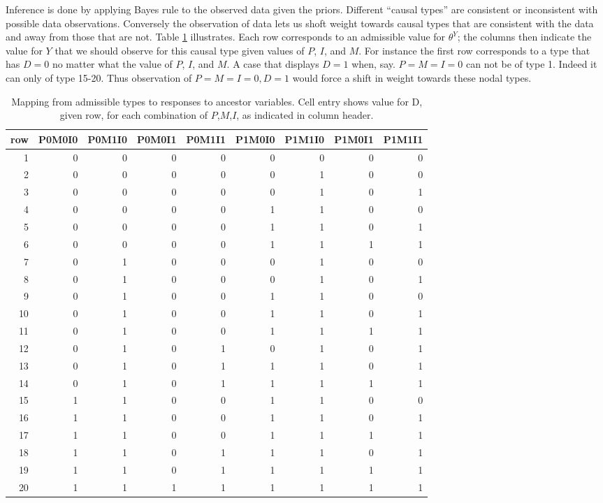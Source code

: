 \documentclass[12pt,]{book}
\begin{document}
Inference is done by applying Bayes rule to the observed data given the priors. Different ``causal types'' are consistent or inconsistent with possible data observations. Conversely the observation of data lets us shoft weight towards causal types that are consistent with the data and away from those that are not. Table \ref{tab:typemat} illustrates. Each row corresponds to an admissible value for \(\theta^Y\); the columns then indicate the value for \(Y\) that we should observe for this causal type given values of \(P\), \(I\), and \(M\). For instance the first row corresponds to a type that has \(D=0\) no matter what the value of \(P\), \(I\), and \(M\). A case that displays \(D=1\) when, say. \(P=M=I=0\) can not be of type 1. Indeed it can only of type 15-20. Thus observation of \(P=M=I=0, D=1\) would force a shift in weight towards these nodal types.

\begin{table}[t]

\caption{\label{tab:typemat}Mapping from admissible types to responses to ancestor variables. Cell entry shows value for D, given row, for each combination of $P$,$M$,$I$, as indicated in column header.}
\centering
\begin{tabular}{r|r|r|r|r|r|r|r|r}
\hline
row & P0M0I0 & P0M1I0 & P0M0I1 & P0M1I1 & P1M0I0 & P1M1I0 & P1M0I1 & P1M1I1\\
\hline
1 & 0 & 0 & 0 & 0 & 0 & 0 & 0 & 0\\
\hline
2 & 0 & 0 & 0 & 0 & 0 & 1 & 0 & 0\\
\hline
3 & 0 & 0 & 0 & 0 & 0 & 1 & 0 & 1\\
\hline
4 & 0 & 0 & 0 & 0 & 1 & 1 & 0 & 0\\
\hline
5 & 0 & 0 & 0 & 0 & 1 & 1 & 0 & 1\\
\hline
6 & 0 & 0 & 0 & 0 & 1 & 1 & 1 & 1\\
\hline
7 & 0 & 1 & 0 & 0 & 0 & 1 & 0 & 0\\
\hline
8 & 0 & 1 & 0 & 0 & 0 & 1 & 0 & 1\\
\hline
9 & 0 & 1 & 0 & 0 & 1 & 1 & 0 & 0\\
\hline
10 & 0 & 1 & 0 & 0 & 1 & 1 & 0 & 1\\
\hline
11 & 0 & 1 & 0 & 0 & 1 & 1 & 1 & 1\\
\hline
12 & 0 & 1 & 0 & 1 & 0 & 1 & 0 & 1\\
\hline
13 & 0 & 1 & 0 & 1 & 1 & 1 & 0 & 1\\
\hline
14 & 0 & 1 & 0 & 1 & 1 & 1 & 1 & 1\\
\hline
15 & 1 & 1 & 0 & 0 & 1 & 1 & 0 & 0\\
\hline
16 & 1 & 1 & 0 & 0 & 1 & 1 & 0 & 1\\
\hline
17 & 1 & 1 & 0 & 0 & 1 & 1 & 1 & 1\\
\hline
18 & 1 & 1 & 0 & 1 & 1 & 1 & 0 & 1\\
\hline
19 & 1 & 1 & 0 & 1 & 1 & 1 & 1 & 1\\
\hline
20 & 1 & 1 & 1 & 1 & 1 & 1 & 1 & 1\\
\hline
\end{tabular}
\end{table}
\end{document}
